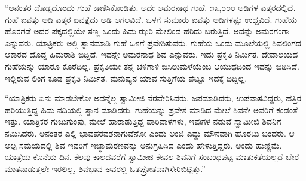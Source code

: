  “ಅನಂತರ ದೊಡ್ಡದೊಂದು ಗುಹೆ ಕಾಣಿಸಿಕೊಂಡಿತು. ಅದೇ ಅಮರನಾಥ ಗುಹೆ. ೧೩,೦೦೦ ಅಡಿಗಳ ಎತ್ತರದಲ್ಲಿದೆ. ಗುಹೆ ಐವತ್ತು ಅಡಿ ಎತ್ತರ ಐವತ್ತೈದು ಅಡಿ ಅಗಲವಿದೆ. ಒಳಗೆ ಸುಮಾರು ಐವತ್ತು ಅಡಿಗಳಷ್ಟು ಉದ್ದವಿದೆ. ಗುಹೆಯ ಹೊರಗಡೆ ಅದರ ಪಕ್ಕದಲ್ಲಿಯೇ ಸಣ್ಣ ಒಂದು ಹಿಮ ಝರಿ ಮೇಲಿಂದ ಹರಿದು ಬರುತ್ತಿದೆ. ಅದನ್ನು ಅಮರಗಂಗಾ ಎನ್ನುವರು. ಯಾತ್ರಿಕರು ಅಲ್ಲಿ ಸ್ನಾನಮಾಡಿ ಗುಹೆ ಒಳಗೆ ಪ್ರವೇಶಿಸುವರು. ಗುಹೆಯ ಒಂದು ಮೂಲೆಯಲ್ಲಿ ಶಿವಲಿಂಗದ ಆಕಾರದ ದೊಡ್ಡ ಹಿಮರಾಶಿ ಬಿದ್ದಿದೆ. ಇದನ್ನೇ ಅಮರನಾಥ ಶಿವ ಎನ್ನುವರು. ಇದು ಪ್ರಕೃತಿ ನಿರ್ಮಿತ. ದೇವಾಲಯದ ಗುಹೆಯನ್ನು ಯಾರೂ ಕೊರೆದಿಲ್ಲ. ಪ್ರಕೃತಿಯೇ ತನ್ನ ಚಳಿಗಾಳಿ ಬಿಸಿಲುಮಳೆಯೆಂಬ ಆಯುಧದಿಂದ ಇದನ್ನು ಬಿಡಿಸಿದೆ. ಇಲ್ಲಿರುವ ಲಿಂಗ ಕೂಡ ಪ್ರಕೃತಿ ನಿರ್ಮಿತ. ಮನುಷ್ಯನ ಯಾವ ಸುತ್ತಿಗೆಯ ಪೆಟ್ಟೂ ಇದಕ್ಕೆ ಬಿದ್ದಿಲ್ಲ.

 “ಯಾತ್ರಿಕರು ಏನು ಮಾಡಬೇಕೋ ಅದನ್ನೆಲ್ಲ ಸ್ವಾಮೀಜಿ ನೆರವೇರಿಸಿದರು. ಜಪಮಾಡಿದರು, ಉಪವಾಸವಿದ್ದರು, ಹತ್ತಿರ ಹರಿಯುತ್ತಿದ್ದ ಹಿಮ ನದಿಯಲ್ಲಿ ಸ್ನಾನ ಮಾಡಿದರು. ಗುಹೆಯನ್ನು ಪ್ರವೇಶ ಮಾಡಿದ ಮೇಲೆ ಶಿವನೇ ಅವರಿಗೆ ಕಂಡಂತೆ ಇತ್ತು. ಯಾತ್ರಿಕರ ಗುಜುಗುಂಪು, ಮೇಲೆ ಹಾರಾಡುತ್ತಿದ್ದ ಪಾರಿವಾಳಗಳು, ಇವುಗಳ ನಡುವೆ ಸ್ವಾಮೀಜಿ ಶಿವನಿಗೆ ನಮಿಸಿದರು. ಅನಂತರ ಎಲ್ಲಿ ಭಾವಪರವಶನಾಗುವೆನೋ ಎಂದು ಅಂಜಿ ಎದ್ದು ಮೌನವಾಗಿ ಹೊರಟು ಬಂದರು. ಆ ಅಲ್ಪ ಸಮಯದಲ್ಲಿ ಶಿವ ಇವರಿಗೆ ಇಚ್ಛಾಮರಣವನ್ನು ಅನುಗ್ರಹಿಸಿದ ಎಂದು ಹೇಳುತ್ತಿದ್ದರು. ಅಂದು ಹುಣ್ಣಿಮೆ. ಯಾತ್ರೆಯ ಕೊನೆಯ ದಿನ. ಕೆಲವು ಕಾಲದವರೆಗೆ ಸ್ವಾಮೀಜಿ ಕೇವಲ ಶಿವನಿಗೆ ಸಂಬಂಧಪಟ್ಟ ಮಾತುಕತೆಯಲ್ಲದೆ ಬೇರೆ ಮಾತನಾಡುತ್ತಲೇ ಇರಲಿಲ್ಲ, ಶಿವಭಾವ ಅವರಲ್ಲಿ ಓತಪ್ರೋತವಾಗಿಸೇರಿಬಿಟ್ಟಿತ್ತು.” 

